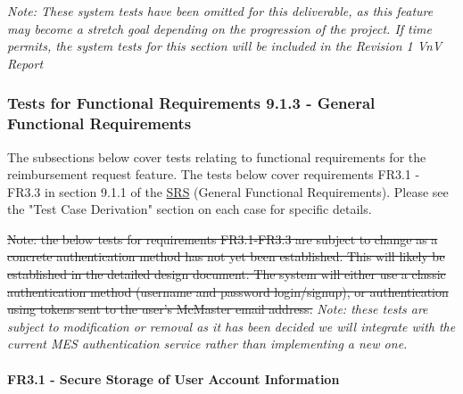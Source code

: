\documentclass[12pt, titlepage]{article}
\begin{document}
\textit{Note: These system tests have been omitted for this deliverable, as this feature may become a stretch goal depending on the progression of the project. If time permits, the system tests for this section will be included in the Revision 1 VnV Report}

\subsubsection{Tests for Functional Requirements 9.1.3 - General Functional Requirements}

The subsections below cover tests relating to functional requirements for the reimbursement request feature. The tests below cover requirements FR3.1 - FR3.3 in section 9.1.1 of the \href{https://shorturl.at/FdAgR}{SRS} (General Functional Requirements). Please see the "Test Case Derivation" section on each case for specific details.

\st{Note: the below tests for requirements FR3.1-FR3.3 are subject to change as a concrete authentication method has not yet been established. This will likely be established in the detailed design document. The system will either use a classic authentication method (username and password login/signup), or authentication using tokens sent to the user's McMaster email address.}
\textit{Note: these tests are subject to modification or removal as it has been decided we will integrate with the current MES authentication service rather than implementing a new one.}
\paragraph{FR3.1 - Secure Storage of User Account Information}
\end{document}
